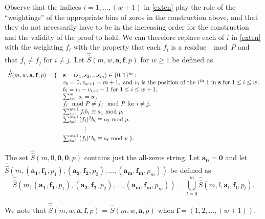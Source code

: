 Observe that the indices $i=1,\dots,(w+1)$ in \eqref{exten} play the
role of the ``weightings'' of the appropriate bins of zeros in the
construction above, and that they do not necessarily have to be in
the increasing order for the construction and the validity of the
proof to hold. We can therefore replace each of $i$ in \eqref{exten}
with the weighting $f_i$ with the property that each $f_i$ is a
residue $\mod P$ and that $f_i \neq f_j$ for $i\neq j$. Let
$\hat{\hat{S}}(m,w,\mathbf{a},\mathbf{f}, p)$  for $w \geq 1$ be
defined as
\begin{equation}\label{exten2}\begin{array}{lll}\hat{\hat{S}}(m,w,\mathbf{a},\mathbf{f},p) = \{ & \mathbf{s}=(s_1, s_2, ... s_m) \in \{0,1\}^m
:\\{} & v_0=0, v_{w+1}=m+1,\text{ and } v_i \text{ is the position
of the $i^{\text{th}}$ 1 in $\mathbf{s}$ for } 1 \leq i \leq w,\\{}
& b_i=v_i-v_{i-1}-1 \text{ for } 1 \leq i \leq w+1,\\
{} & \sum_{i=1}^m s_i = w,\\
{} & f_i \mod P \neq f_j \mod P \text{ for } i \neq j,\\
 {} & \sum_{i=1}^{w+1} f_ib_i \equiv a_1 \text{ mod } p,\\ {} &
\sum_{i=1}^{w+1} (f_i)^2b_i
\equiv a_2 \text{ mod } p,\\
{} & \hspace{0.5in}\vdots\\ {} & \sum_{i=1}^{w+1} (f_i)^rb_i \equiv
a_t \text{ mod } p~\}.\end{array}\end{equation}

The set $\hat{\hat{S}}(m,0,\mathbf{0},\mathbf{0},p)$ contains just
the all-zeros string. Let $\mathbf{a_0} = \mathbf{0}$ and let
\newline \noindent $\hat{\hat{S}}\left(m,(\mathbf{a_1},\mathbf{f_1},p_1),(\mathbf{a_2},\mathbf{f_2},p_2),...,(\mathbf{a_m},\mathbf{f_m},p_m)\right)$
be defined as
\begin{equation}\label{union}\hat{\hat{S}}\left(m,(\mathbf{a_1},\mathbf{f_1},p_1),(\mathbf{a_2},\mathbf{f_2}, p_2),...,(\mathbf{a_m},\mathbf{f_m},p_m)\right)=
\bigcup_{l=0}^{m}
\hat{\hat{S}}(m,l,\mathbf{a_l},\mathbf{f_l},p_l).\end{equation}

We note that $\hat{\hat{S}}(m,w,\mathbf{a},\mathbf{f}, p)$ =
$\hat{S}(m,w,\mathbf{a},p)$ when $\mathbf{f}=(1,2,\dots,(w+1))$.

